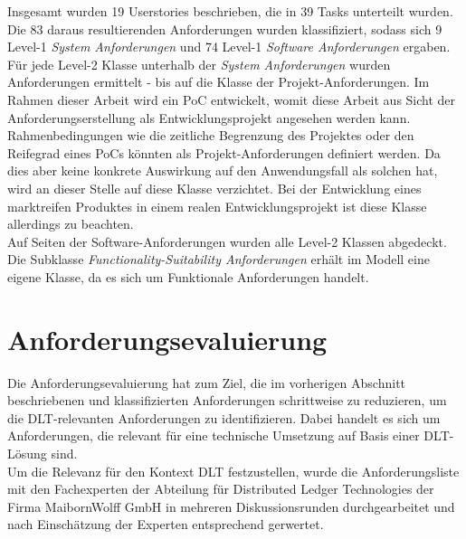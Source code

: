 Insgesamt wurden 19 Userstories beschrieben, die in 39 Tasks unterteilt wurden. Die 83 daraus resultierenden Anforderungen wurden klassifiziert, sodass sich 9 Level-1 \textit{System Anforderungen} und 74 Level-1 \textit{Software Anforderungen} ergaben. Für jede Level-2 Klasse unterhalb der \textit{System Anforderungen} wurden Anforderungen ermittelt - bis auf die Klasse der Projekt-Anforderungen. Im Rahmen dieser Arbeit wird ein \ac{PoC} entwickelt, womit diese Arbeit aus Sicht der Anforderungserstellung als Entwicklungsprojekt angesehen werden kann. Rahmenbedingungen wie die zeitliche Begrenzung des Projektes oder den Reifegrad eines \ac{PoC}s könnten als Projekt-Anforderungen definiert werden. Da dies aber keine konkrete Auswirkung auf den Anwendungsfall als solchen hat, wird an dieser Stelle auf diese Klasse verzichtet. Bei der Entwicklung eines marktreifen Produktes in einem realen Entwicklungsprojekt ist diese Klasse allerdings zu beachten.\\
Auf Seiten der Software-Anforderungen wurden alle Level-2 Klassen abgedeckt. Die Subklasse \textit{Functionality-Suitability Anforderungen} erhält im Modell eine eigene Klasse, da es sich um Funktionale Anforderungen handelt.

%
%
\section{Anforderungsevaluierung}
\label{sec:requirements:evaluation}
Die Anforderungsevaluierung hat zum Ziel, die im vorherigen Abschnitt beschriebenen und klassifizierten Anforderungen schrittweise zu reduzieren, um die \ac{DLT}-relevanten Anforderungen zu identifizieren. Dabei handelt es sich um Anforderungen, die relevant für eine technische Umsetzung auf Basis einer \ac{DLT}-Lösung sind.\\
Um die Relevanz für den Kontext \ac{DLT} festzustellen, wurde die Anforderungsliste mit den Fachexperten der Abteilung für Distributed Ledger Technologies der Firma MaibornWolff GmbH in mehreren Diskussionsrunden durchgearbeitet und nach Einschätzung der Experten entsprechend gerwertet.


